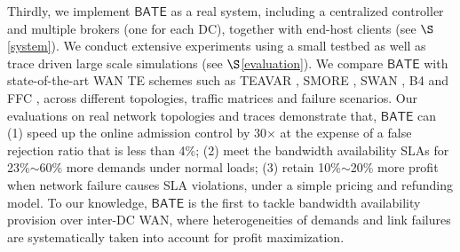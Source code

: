 \documentclass[sigconf]{acmart}
\begin{document}
Thirdly, 
we implement $\mathsf{BATE}$ as a real system, including a centralized controller and multiple brokers (one for each DC),  together with end-host clients (see $\S$\ref{system}).
 We conduct extensive experiments using a small testbed as well as trace driven large scale simulations (see $\S$\ref{evaluation}).
We compare  $\mathsf{BATE}$ with state-of-the-art WAN TE schemes such as TEAVAR \cite{Teavar}, SMORE \cite{SMORE}, SWAN \cite{swan}, B4 \cite{B4} and FFC \cite{FFC}, across different topologies, traffic matrices and failure scenarios.
Our evaluations on real network topologies and traces demonstrate that, $\mathsf{BATE}$ can 
(1) speed up the online admission control by 30$\times $ at the expense of a false rejection ratio that is less than 4\%;
(2) meet the bandwidth availability SLAs for 23\%$\sim$60\% more demands under normal loads;
(3) retain 10\%$\sim$20\% more profit when network failure causes SLA violations, under a simple pricing and refunding model. 
To our knowledge, $\mathsf{BATE}$ is the first to tackle bandwidth availability provision over inter-DC WAN, where heterogeneities of demands and link failures are systematically taken into account for profit maximization.  

%
\end{document}
